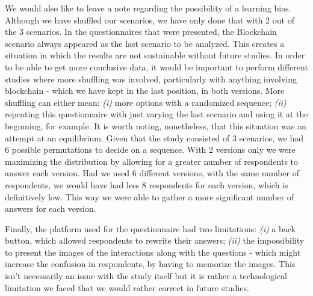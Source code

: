We would also like to leave a note regarding the possibility of a learning bias. Although we have shuffled our scenarios, we have only done that with 2 out of the 3 scenarios. In the questionnaires that were presented, the Blockchain scenario always appeared as the last scenario to be analyzed. This creates a situation in which the results are not sustainable without future studies. In order to be able to get more conclusive data, it would be important to perform different studies where more shuffling was involved, particularly with anything involving blockchain - which we have kept in the last position, in both versions. More shuffling can either mean: \textit{(i)} more options with a randomized sequence; \textit{(ii)} repeating this questionnaire with just varying the last scenario and using it at the beginning, for example. It is worth noting, nonetheless, that this situation was an attempt at an equilibrium. Given that the study consisted of 3 scenarios, we had 6 possible permutations to decide on a sequence. With 2 versions only we were maximizing the distribution by allowing for a greater number of respondents to answer each version. Had we used 6 different versions, with the same number of respondents, we would have had less 8 respondents for each version, which is definitively low. This way we were able to gather a more significant number of answers for each version.

Finally, the platform used for the questionnaire had two limitations: \textit{(i)} a back button, which allowed respondents to rewrite their answers; \textit{(ii)} the impossibility to present the images of the interactions along with the questions - which might increase the confusion in respondents, by having to memorize the images. This isn't necessarily an issue with the study itself but it is rather a technological limitation we faced that we would rather correct in future studies.